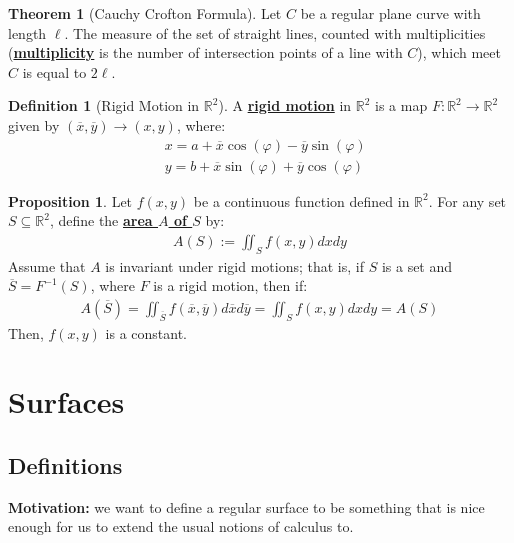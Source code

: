\documentclass[11pt]{scrartcl}
\newcommand{\R}[0]{\mathbb{R}}
\theoremstyle{definition}
\newtheorem{theorem}{Theorem}
\newtheorem{definition}{Definition}
\newtheorem{prop}{Proposition}
\theoremstyle{remark}
\newcommand{\dfn}[1]{\textbf{\underline{#1}}}
\begin{document}
\begin{theorem}[Cauchy Crofton Formula]
	Let $C$ be a regular plane curve with length $\ell$. The measure of the set of straight lines, counted with multiplicities (\dfn{multiplicity} is the number of intersection points of a line with $C$), which meet $C$ is equal to $2 \ell$. 
\end{theorem}

\begin{definition}[Rigid Motion in $\R^2$]
	A \dfn{rigid motion} in $\R^2$ is a map $F: \R^2 \rightarrow \R^2$ given by $(\overline{x}, \overline{y}) \rightarrow (x,y)$, where: 
	\begin{align*}
		& x = a + \overline{x} \cos(\varphi) - \overline{y} \sin( \varphi) \\
		& y = b + \overline{x} \sin( \varphi) + \overline{y} \cos (\varphi) 
	\end{align*}
\end{definition}

\begin{prop}
	Let $f(x,y)$ be a continuous function defined in $\R^2$. For any set $S \subseteq \R^2$, define the \dfn{area $A$ of $S$} by: 
	\begin{align}
	A(S) := \iint_{S} f(x,y) dx dy 	
	\end{align}
	Assume that $A$ is invariant under rigid motions; that is, if $S$ is a set and $\overline{S} = F^{-1}(S)$, where $F$ is a rigid motion, then if: 
	\begin{align*}
		A (\overline{S} ) = \iint_{\overline{S}} f(\overline{x}, \overline{y}) d \overline{x} d \overline{y} 	= \iint_{S} f(x,y) dx dy 	= A(S)
	\end{align*}
	Then, $f(x,y)$ is a constant. 
\end{prop}


\section{Surfaces}

\subsection{Definitions}

\textbf{Motivation:} we want to define a regular surface to be something that is nice enough for us to extend the usual notions of calculus to. 
\end{document}

